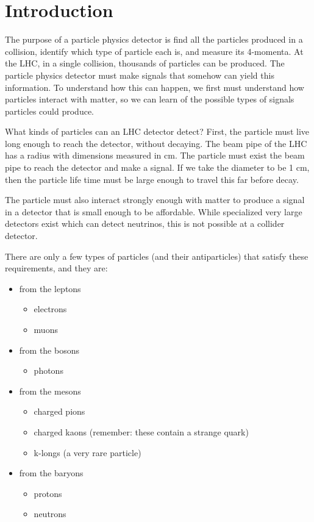 
\section{Introduction}

The purpose of a particle physics detector is find all the particles produced
in a collision, identify which type of particle each is, and measure its 4-momenta.
At the LHC, in a single collision, thousands of particles can be produced.
The particle physics detector must make signals that somehow can yield this information.
To understand how this can happen, we first must understand how particles interact
with matter, so we can learn of the possible types of signals particles could produce.

What kinds of particles can an LHC detector detect?  First, the particle must live long 
enough to reach the detector, without decaying.  The beam pipe of the LHC has a 
radius with dimensions measured in cm.  The particle must exist the beam pipe to
reach the detector and make a signal.  If we take the diameter to be 1 cm, then
the particle life time must be large enough to travel this far before decay.

The particle must also interact strongly enough with matter to produce a signal in a detector that is small enough to be affordable.  While specialized very large detectors exist which can detect neutrinos, this is not possible at a collider detector.

There are only a few types of particles (and their antiparticles) that satisfy these requirements, and they are:
\begin{itemize}
\item from the leptons
\begin{itemize}
\item electrons
\item muons
\end{itemize}
\item from the bosons
\begin{itemize}
\item photons
\end{itemize}
\item from the mesons
\begin{itemize}
\item charged pions
\item charged kaons (remember: these contain a strange quark)
\item k-longs (a very rare particle)
\end{itemize}
\item from the baryons
\begin{itemize}
\item protons
\item neutrons
\end{itemize}
\end{itemize}

